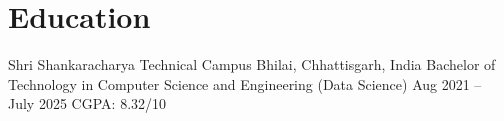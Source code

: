 \section*{Education}

\education
      {Shri Shankaracharya Technical Campus}
      {Bhilai, Chhattisgarh, India}
      {Bachelor of Technology in Computer Science and Engineering (Data Science)}
      {Aug 2021 -- July 2025}
      {CGPA: 8.32/10}
